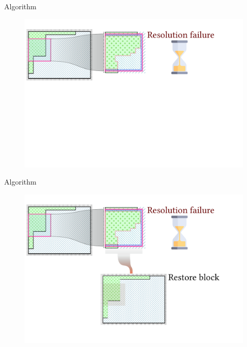 \documentclass{beamer}
\begin{document}
  \begin{frame}[fragile]{Algorithm}
    \begin{figure}
      \includegraphics[width=\textwidth]{figs/poms_alg5.pdf}
    \end{figure}
  \end{frame}

  \begin{frame}[fragile]{Algorithm}
    \begin{figure}
      \includegraphics[width=\textwidth]{figs/poms_alg5_1.pdf}
    \end{figure}
  \end{frame}
\end{document}
